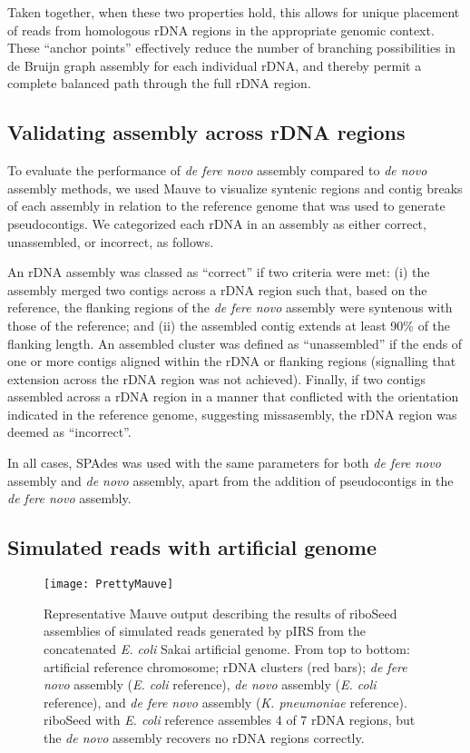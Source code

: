 \documentclass[a4,center,fleqn]{NAR}
\begin{document}
Taken together, when these two properties hold, this allows for unique placement of reads from homologous rDNA regions in the appropriate genomic context. These ``anchor points'' effectively reduce the number of branching possibilities in de Bruijn graph assembly for each individual rDNA, and thereby permit a complete balanced path through the full rDNA region.

\subsection*{Validating assembly across rDNA regions}

To evaluate the performance of \textit{de fere novo} assembly compared to \textit{de novo} assembly methods, we used Mauve to visualize syntenic regions and contig breaks of each assembly in relation to the reference genome that was used to generate pseudocontigs. We categorized each rDNA in an assembly as either correct, unassembled, or incorrect, as follows.

An rDNA assembly was classed as ``correct'' if two criteria were met: (i) the assembly merged two contigs across a rDNA region such that, based on the reference, the flanking regions of the \textit{de fere novo} assembly were syntenous with those of the reference; and (ii) the assembled contig extends at least 90\% of the flanking length. An assembled cluster was defined as ``unassembled'' if the ends of one or more contigs aligned within the rDNA or flanking regions (signalling that extension across the rDNA region was not achieved). Finally, if two contigs assembled across a rDNA region in a manner that conflicted with the orientation indicated in the reference genome, suggesting missasembly, the rDNA region was deemed as ``incorrect''.

In all cases, SPAdes was used with the same parameters for both \textit{de fere novo} assembly and \textit{de novo} assembly, apart from the addition of pseudocontigs in the \textit{de fere novo} assembly.

\subsection*{Simulated reads with artificial genome}


\begin{figure}[!b]
    \centering
    \hspace*{-.7cm}\texttt{[image: PrettyMauve]}
    \caption{Representative Mauve output describing the results of riboSeed assemblies of simulated reads generated by pIRS from the concatenated \textit{E. coli} Sakai artificial genome. From top to bottom: artificial reference chromosome; rDNA clusters (red bars); \textit{de fere novo} assembly (\textit{E. coli} reference), \textit{de novo} assembly (\textit{E. coli} reference), and \textit{de fere novo} assembly (\textit{K. pneumoniae} reference). riboSeed with \textit{E. coli} reference assembles 4 of 7 rDNA regions, but the \textit{de novo} assembly recovers no rDNA regions correctly.
}
\label{fig:artificial}
\end{figure}
\end{document}
